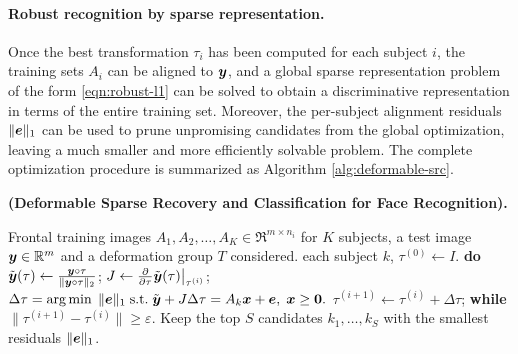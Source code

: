 \documentclass[10pt,twocolumn,letterpaper]{article}
\newcommand{\subj}{\mathrm{subj}}
\begin{document}
\paragraph{Robust recognition by sparse representation.}
Once the best transformation $\tau_i$ has been computed for each subject $i$, the training sets $A_i$ can be aligned to ${\boldsymbol{y}}$, and a global sparse representation problem of the form \eqref{eqn:robust-l1} can be solved to obtain a discriminative representation in terms of the entire training set. Moreover, the per-subject alignment residuals $\| \boldsymbol{e} \|_1$ can be used to prune unpromising candidates from the global optimization, leaving a much smaller and more efficiently solvable problem. The complete optimization procedure is summarized as Algorithm \ref{alg:deformable-src}. \vspace{-2mm}
\begin{algorithm}[thb]
\begin{small}
\caption{\bf \small  (Deformable Sparse Recovery and Classification for Face Recognition).} \label{alg:deformable-src}
\begin{algorithmic}[1]
 Frontal training images $A_1, A_2, \ldots, A_K \in \Re^{m\times n_i}$ for $K$ subjects,  a test image ${\boldsymbol{y}}\in\mathbb R^m$ and a deformation group $T$ considered.
 each subject $k$, 
\STATE \hspace{3mm} $\tau^{(0)} \leftarrow I$.
\STATE \hspace{3mm} {\bf do}
\STATE \hspace{6mm} $\tilde {{\boldsymbol{y}}}(\tau) \leftarrow \frac{{\boldsymbol{y}} \circ \tau}{\|{\boldsymbol{y}} \circ \tau\|_2}$; \;\;\; $J \leftarrow  \frac{\partial}{\partial \tau} \tilde{{\boldsymbol{y}}}(\tau)  \bigr|_{\tau^{(i)}} $;\vspace{1mm}
\STATE \hspace{6mm} $ \Delta \tau =  \arg\min \; \| \boldsymbol{e} \|_1  \; \mathrm{s.t.} \; \tilde {{\boldsymbol{y}}} + J \Delta \tau = A_k {\boldsymbol{x}} + \boldsymbol{e}, \; {\boldsymbol{x}} \ge \boldsymbol{0}.$
\STATE \hspace{6mm} $\tau^{(i+1)} \leftarrow \tau^{(i)} + \Delta \tau$; 
\STATE \hspace{3mm} {\bf while} $\| \tau^{(i+1)} - \tau^{(i)} \| \ge \varepsilon$.
\STATE Keep the top $S$ candidates $k_1, \ldots, k_S$ with the smallest residuals $\|\boldsymbol{e}\|_1$. 

\end{algorithmic}
\end{small}
\end{algorithm}
\end{document}
